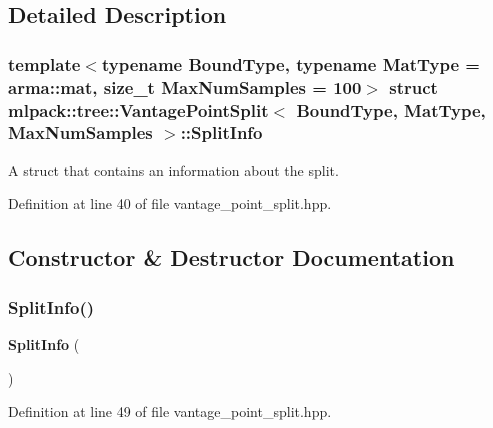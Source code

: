 \subsection{Detailed Description}
\subsubsection*{template$<$typename Bound\+Type, typename Mat\+Type = arma\+::mat, size\+\_\+t Max\+Num\+Samples = 100$>$\newline
struct mlpack\+::tree\+::\+Vantage\+Point\+Split$<$ Bound\+Type, Mat\+Type, Max\+Num\+Samples $>$\+::\+Split\+Info}

A struct that contains an information about the split. 

Definition at line 40 of file vantage\+\_\+point\+\_\+split.\+hpp.



\subsection{Constructor \& Destructor Documentation}
\mbox{\label{structmlpack_1_1tree_1_1VantagePointSplit_1_1SplitInfo_a78ccc3ae24630c087a363e5c72075692}} 
\subsubsection{Split\+Info()\hspace{0.1cm}{\footnotesize\ttfamily [1/2]}}
{\footnotesize\ttfamily \textbf{ Split\+Info} (\begin{DoxyParamCaption}{ }\end{DoxyParamCaption})\hspace{0.3cm}{\ttfamily [inline]}}



Definition at line 49 of file vantage\+\_\+point\+\_\+split.\+hpp.

\mbox{\label{structmlpack_1_1tree_1_1VantagePointSplit_1_1SplitInfo_afb282cb1a9a0f77128f3529ef65a6c87}} 
